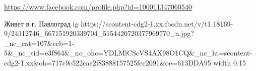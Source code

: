  
 
 
 
 

\url{https://www.facebook.com/profile.php?id=100011347060540}\par
Живет в г. Павлоград
\ifcmt
  ig https://scontent-cdg2-1.xx.fbcdn.net/v/t1.18169-9/24312746_667151920339704_5154420720377969770_n.jpg?_nc_cat=107&ccb=1-5&_nc_sid=e3f864&_nc_ohc=YDLMlCScVS4AX98O1CQ&_nc_ht=scontent-cdg2-1.xx&oh=717c9c522cae2f83888157525fec2091&oe=613DDA95
  width 0.15
\fi

